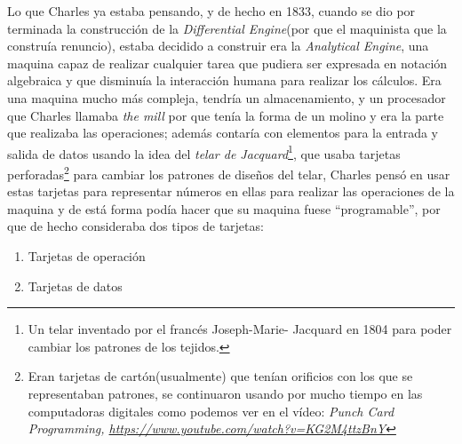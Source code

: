 \documentclass[letterpaper,12pt,oneside]{book}
\begin{document}
		Lo que Charles ya estaba pensando, y de hecho en 1833, cuando se dio por terminada la construcción de la \textit{Differential Engine}(por que el maquinista que la 
		construía renuncio), estaba decidido a construir era la  \textit{Analytical Engine}, una maquina capaz de realizar cualquier tarea que pudiera
		ser expresada en notación algebraica  y que disminuía la interacción humana para realizar los cálculos. Era una maquina mucho más compleja, tendría un
		almacenamiento, y un procesador que Charles llamaba \textit{the mill} por que tenía la forma de un molino y era la parte que realizaba las operaciones; además
		contaría con elementos para la entrada y salida de datos usando la idea del \textit{telar de Jacquard}\footnote{ Un telar inventado por el francés Joseph-Marie-	Jacquard en 1804 para poder cambiar los patrones de los tejidos.}, que usaba tarjetas perforadas\footnote{Eran tarjetas de 
		cartón(usualmente) que tenían orificios con los que se representaban patrones, se continuaron usando por mucho tiempo en las computadoras digitales como podemos ver en 
		el vídeo: \emph{Punch Card Programming, \url{https://www.youtube.com/watch?v=KG2M4ttzBnY} }}
		para cambiar los patrones de diseños del telar, Charles pensó en usar estas tarjetas para representar números en ellas para realizar las operaciones
		de la maquina y de está forma podía hacer que su maquina fuese ``programable'', por que de hecho consideraba dos tipos de tarjetas:
		
		\begin{enumerate}
			\item Tarjetas de operación
			\item Tarjetas de datos
		\end{enumerate}
		
\end{document}
